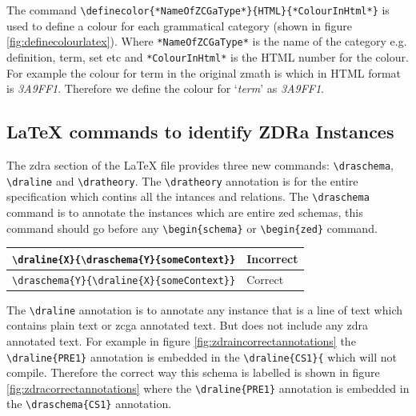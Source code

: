 The command \verb|\definecolor{*NameOfZCGaType*}{HTML}{*ColourInHtml*}| is used to define a colour for each grammatical category (shown in figure \ref{fig:definecolourlatex}). Where \verb|*NameOfZCGaType*| is the name of the category e.g. definition, term, set etc and \verb|*ColourInHtml*| is the HTML number for the colour. For example the colour for term in the original \gls{zmath} is  which in HTML format is \emph{3A9FF1}. Therefore we define the colour for `\emph{term}' as \emph{3A9FF1}.

\subsection{\LaTeX{} commands to identify ZDRa Instances}

The \gls{zdra} section of the \LaTeX{} file provides three new commands: \verb|\draschema|, \verb|\draline| and \verb|\dratheory|. The \verb|\dratheory| annotation is for the entire specification which contins all the intances and relations. The \verb|\draschema| command is to annotate the instances which are entire zed schemas, this command should go before any \verb|\begin{schema}| or \verb|\begin{zed}| command.

\begin{tabular}{|l | l|}
\hline
\verb|\draline{X}{\draschema{Y}{someContext}}| & {\color{set}Incorrect} \\
\hline
\verb|\draschema{Y}{\draline{X}{someContext}}| & {\color{set}Correct} \\
\hline
\end{tabular}

 The \verb|\draline| annotation is to annotate any instance that is a line of text which contains plain text or \gls{zcga} annotated text. But does not include any \gls{zdra} annotated text. For example in figure \ref{fig:zdraincorrectannotations} the \verb|\draline{PRE1}| annotation is embedded in the \verb|\draline{CS1}{| which will not compile. Therefore the correct way this schema is labelled is shown in figure \ref{fig:zdracorrectannotations} where the \verb|\draline{PRE1}| annotation is embedded in the \verb|\draschema{CS1}| annotation.

